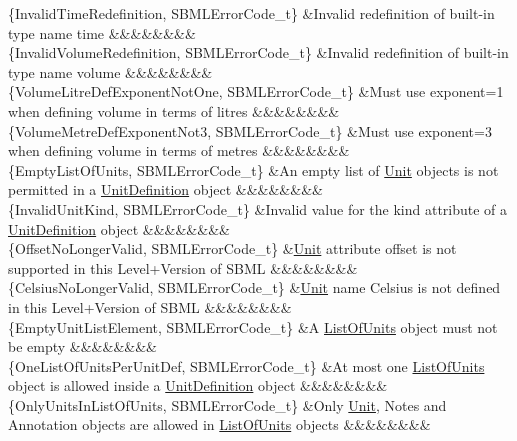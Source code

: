 \begin{DoxyParagraph}{}
\begin{longtabu}
\{Invalid\+Time\+Redefinition, S\+B\+M\+L\+Error\+Code\+\_\+t\} &Invalid redefinition of built-\/in type name \textquotesingle{}time\textquotesingle{} &&&&&&&&\\
\{Invalid\+Volume\+Redefinition, S\+B\+M\+L\+Error\+Code\+\_\+t\} &Invalid redefinition of built-\/in type name \textquotesingle{}volume\textquotesingle{} &&&&&&&&\\
\{Volume\+Litre\+Def\+Exponent\+Not\+One, S\+B\+M\+L\+Error\+Code\+\_\+t\} &Must use \textquotesingle{}exponent\textquotesingle{}=1 when defining \textquotesingle{}volume\textquotesingle{} in terms of litres &&&&&&&&\\
\{Volume\+Metre\+Def\+Exponent\+Not3, S\+B\+M\+L\+Error\+Code\+\_\+t\} &Must use \textquotesingle{}exponent\textquotesingle{}=3 when defining \textquotesingle{}volume\textquotesingle{} in terms of metres &&&&&&&&\\
\{Empty\+List\+Of\+Units, S\+B\+M\+L\+Error\+Code\+\_\+t\} &An empty list of \hyperlink{class_unit}{Unit} objects is not permitted in a \hyperlink{class_unit_definition}{Unit\+Definition} object &&&&&&&&\\
\{Invalid\+Unit\+Kind, S\+B\+M\+L\+Error\+Code\+\_\+t\} &Invalid value for the \textquotesingle{}kind\textquotesingle{} attribute of a \hyperlink{class_unit_definition}{Unit\+Definition} object &&&&&&&&\\
\{Offset\+No\+Longer\+Valid, S\+B\+M\+L\+Error\+Code\+\_\+t\} &\hyperlink{class_unit}{Unit} attribute \textquotesingle{}offset\textquotesingle{} is not supported in this Level+\+Version of S\+B\+ML &&&&&&&&\\
\{Celsius\+No\+Longer\+Valid, S\+B\+M\+L\+Error\+Code\+\_\+t\} &\hyperlink{class_unit}{Unit} name \textquotesingle{}Celsius\textquotesingle{} is not defined in this Level+\+Version of S\+B\+ML &&&&&&&&\\
\{Empty\+Unit\+List\+Element, S\+B\+M\+L\+Error\+Code\+\_\+t\} &A \hyperlink{class_list_of_units}{List\+Of\+Units} object must not be empty &&&&&&&&\\
\{One\+List\+Of\+Units\+Per\+Unit\+Def, S\+B\+M\+L\+Error\+Code\+\_\+t\} &At most one \hyperlink{class_list_of_units}{List\+Of\+Units} object is allowed inside a \hyperlink{class_unit_definition}{Unit\+Definition} object &&&&&&&&\\
\{Only\+Units\+In\+List\+Of\+Units, S\+B\+M\+L\+Error\+Code\+\_\+t\} &Only \hyperlink{class_unit}{Unit}, Notes and Annotation objects are allowed in \hyperlink{class_list_of_units}{List\+Of\+Units} objects &&&&&&&&\\

\end{longtabu}
\end{DoxyParagraph}
